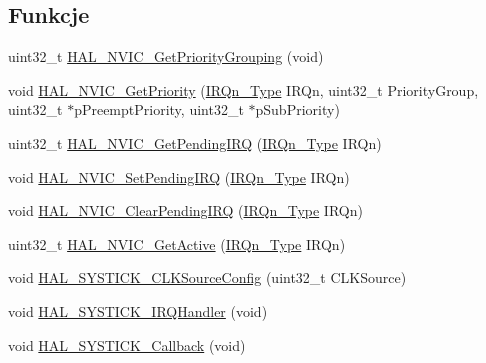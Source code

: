 \subsection*{Funkcje}
\begin{DoxyCompactItemize}
\item 
uint32\+\_\+t \hyperlink{group___c_o_r_t_e_x___exported___functions___group2_gaa02bc953fd4fce22248c491a93c4ce40}{H\+A\+L\+\_\+\+N\+V\+I\+C\+\_\+\+Get\+Priority\+Grouping} (void)
\item 
void \hyperlink{group___c_o_r_t_e_x___exported___functions___group2_ga6a21c9d904b0bcf4cb060f7c5c39b6f5}{H\+A\+L\+\_\+\+N\+V\+I\+C\+\_\+\+Get\+Priority} (\hyperlink{group___peripheral__interrupt__number__definition_ga7e1129cd8a196f4284d41db3e82ad5c8}{I\+R\+Qn\+\_\+\+Type} I\+R\+Qn, uint32\+\_\+t Priority\+Group, uint32\+\_\+t $\ast$p\+Preempt\+Priority, uint32\+\_\+t $\ast$p\+Sub\+Priority)
\item 
uint32\+\_\+t \hyperlink{group___c_o_r_t_e_x___exported___functions___group2_ga3bd5802a96f0dcbc00ac3b89b134da3b}{H\+A\+L\+\_\+\+N\+V\+I\+C\+\_\+\+Get\+Pending\+I\+RQ} (\hyperlink{group___peripheral__interrupt__number__definition_ga7e1129cd8a196f4284d41db3e82ad5c8}{I\+R\+Qn\+\_\+\+Type} I\+R\+Qn)
\item 
void \hyperlink{group___c_o_r_t_e_x___exported___functions___group2_gaecf50f6c6d0e1fa5f8bd8c1b45309f18}{H\+A\+L\+\_\+\+N\+V\+I\+C\+\_\+\+Set\+Pending\+I\+RQ} (\hyperlink{group___peripheral__interrupt__number__definition_ga7e1129cd8a196f4284d41db3e82ad5c8}{I\+R\+Qn\+\_\+\+Type} I\+R\+Qn)
\item 
void \hyperlink{group___c_o_r_t_e_x___exported___functions___group2_ga0c7d007acf1339ca1bb46f3c6e018ff5}{H\+A\+L\+\_\+\+N\+V\+I\+C\+\_\+\+Clear\+Pending\+I\+RQ} (\hyperlink{group___peripheral__interrupt__number__definition_ga7e1129cd8a196f4284d41db3e82ad5c8}{I\+R\+Qn\+\_\+\+Type} I\+R\+Qn)
\item 
uint32\+\_\+t \hyperlink{group___c_o_r_t_e_x___exported___functions___group2_gad3f7598e54fb3d74eaf9abedef704c57}{H\+A\+L\+\_\+\+N\+V\+I\+C\+\_\+\+Get\+Active} (\hyperlink{group___peripheral__interrupt__number__definition_ga7e1129cd8a196f4284d41db3e82ad5c8}{I\+R\+Qn\+\_\+\+Type} I\+R\+Qn)
\item 
void \hyperlink{group___c_o_r_t_e_x___exported___functions___group2_ga3284dc8428996f5b6aa6b3b99e643788}{H\+A\+L\+\_\+\+S\+Y\+S\+T\+I\+C\+K\+\_\+\+C\+L\+K\+Source\+Config} (uint32\+\_\+t C\+L\+K\+Source)
\item 
void \hyperlink{group___c_o_r_t_e_x___exported___functions___group2_ga5b66b62383261c1e0acef98d344aa4c1}{H\+A\+L\+\_\+\+S\+Y\+S\+T\+I\+C\+K\+\_\+\+I\+R\+Q\+Handler} (void)
\item 
void \hyperlink{group___c_o_r_t_e_x___exported___functions___group2_ga5033855e81ba2071231b60599a3ce9a1}{H\+A\+L\+\_\+\+S\+Y\+S\+T\+I\+C\+K\+\_\+\+Callback} (void)
\end{DoxyCompactItemize}


